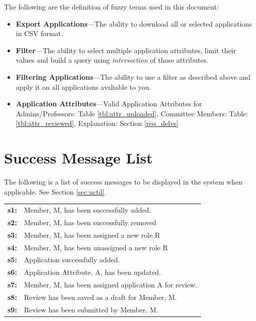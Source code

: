 \documentclass[fontsize=12pt,paper=letter,twoside]{scrartcl}
\begin{document}
The following are the definition of fuzzy terms used in this document:

\begin{itemize}
\item \textbf{Export Applications}---The ability to download all or selected applications in CSV format.
\item \textbf{Filter}---The ability to select multiple application attributes, limit their values and build a query using \emph{intersection} of those attributes.
\item \textbf{Filtering Applications}---The ability to use a filter as described above and apply it on all applications avaliable to you.
\item \textbf{Application Attributes}---Valid Application Attributes for Admins/Professors:  Table \ref{tbl:attr_uploaded}, Committee Members:  Table: \ref{tbl:attr_reviewed}, Explanation: Section \ref{req_delvs}
\end{itemize}

\newpage
\section{Success Message List} \label{app:success}

The following is a list of success messages to be displayed in the system when applicable. See Section \ref{sec:uctd}

\begin{table}[htb]


\begin{tabular}{ll}
\textbf{s1:} & Member, M, has been successfully added.                                                    \\
\textbf{s2:} & Member, M, has been successfully removed \\
\textbf{s3:} & Member, M, has been assigned a new role R                                         \\
\textbf{s4:} & Member, M, has been unassigned a new role R                                          \\
\textbf{s5:} & Application successfully added.                                         \\
\textbf{s6:} & Application Attribute, A, has been updated.                           \\
\textbf{s7:} & Member, M, has been assigned application A for review.                                           \\
\textbf{s8:} & Review has been saved as a draft for Member, M.    \\
\textbf{s9:} & Review has been submitted by Member, M.   \\
\end{tabular}
\label{sucessList}
\end{table}
\end{document}
